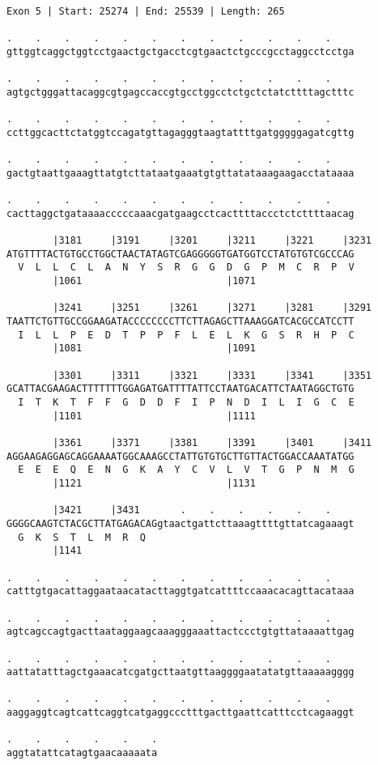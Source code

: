\documentclass{article}
\begin{document}
\newpage
\begin{Verbatim}
Exon 5 | Start: 25274 | End: 25539 | Length: 265
 
.    .    .    .    .    .    .    .    .    .    .    .    
gttggtcaggctggtcctgaactgctgacctcgtgaactctgcccgcctaggcctcctga
  
.    .    .    .    .    .    .    .    .    .    .    .    
agtgctgggattacaggcgtgagccaccgtgcctggcctctgctctatcttttagctttc
  
.    .    .    .    .    .    .    .    .    .    .    .    
ccttggcacttctatggtccagatgttagagggtaagtattttgatgggggagatcgttg
  
.    .    .    .    .    .    .    .    .    .    .    .    
gactgtaattgaaagttatgtcttataatgaaatgtgttatataaagaagacctataaaa
  
.    .    .    .    .    .    .    .    .    .    .    .    
cacttaggctgataaaacccccaaacgatgaagcctcacttttaccctctcttttaacag
  
        |3181     |3191     |3201     |3211     |3221     |3231
ATGTTTTACTGTGCCTGGCTAACTATAGTCGAGGGGGTGATGGTCCTATGTGTCGCCCAG
  V  L  L  C  L  A  N  Y  S  R  G  G  D  G  P  M  C  R  P  V
        |1061                         |1071                 
  
        |3241     |3251     |3261     |3271     |3281     |3291
TAATTCTGTTGCCGGAAGATACCCCCCCCTTCTTAGAGCTTAAAGGATCACGCCATCCTT
  I  L  L  P  E  D  T  P  P  F  L  E  L  K  G  S  R  H  P  C
        |1081                         |1091                 
  
        |3301     |3311     |3321     |3331     |3341     |3351
GCATTACGAAGACTTTTTTTGGAGATGATTTTATTCCTAATGACATTCTAATAGGCTGTG
  I  T  K  T  F  F  G  D  D  F  I  P  N  D  I  L  I  G  C  E
        |1101                         |1111                 
  
        |3361     |3371     |3381     |3391     |3401     |3411
AGGAAGAGGAGCAGGAAAATGGCAAAGCCTATTGTGTGCTTGTTACTGGACCAAATATGG
  E  E  E  Q  E  N  G  K  A  Y  C  V  L  V  T  G  P  N  M  G
        |1121                         |1131                 
  
        |3421     |3431       .    .    .    .    .    .    
GGGGCAAGTCTACGCTTATGAGACAGgtaactgattcttaaagttttgttatcagaaagt
  G  K  S  T  L  M  R  Q                                    
        |1141                                               
  
.    .    .    .    .    .    .    .    .    .    .    .    
catttgtgacattaggaataacatacttaggtgatcattttccaaacacagttacataaa
  
.    .    .    .    .    .    .    .    .    .    .    .    
agtcagccagtgacttaataggaagcaaagggaaattactccctgtgttataaaattgag
  
.    .    .    .    .    .    .    .    .    .    .    .    
aattatatttagctgaaacatcgatgcttaatgttaaggggaatatatgttaaaaagggg
  
.    .    .    .    .    .    .    .    .    .    .    .    
aaggaggtcagtcattcaggtcatgaggccctttgacttgaattcatttcctcagaaggt
  
.    .    .    .    .    .
aggtatattcatagtgaacaaaaata
\end{Verbatim}
\end{document}
